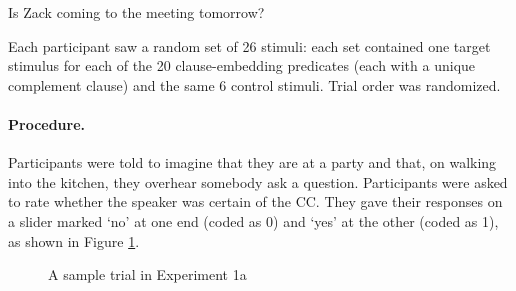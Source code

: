 \documentclass{language}
\newcommand{\6}{\mbox{$[\hspace*{-.6mm}[$}}
\newcommand{\9}{\mbox{$]\hspace*{-.6mm}]$}}
\begin{document}
\begin{exe}
\ex\label{control} Is Zack coming to the meeting tomorrow?
\end{exe}


Each participant saw a random set of 26 stimuli: each set contained one target stimulus for each of the 20 clause-embedding predicates (each with a unique complement clause) and the same 6 control stimuli. Trial order was randomized.

\paragraph{Procedure.} Participants were told to imagine that they are at a party and that, on walking into the kitchen, they overhear somebody ask a question. Participants were asked to rate whether the speaker was certain of the CC. They gave their responses on a slider marked `no' at one end (coded as 0) and `yes' at the other (coded as 1), as shown in Figure \ref{fig-trial-exp1}.


\begin{figure}[h!]
\begin{center}
\end{center}
\caption{A sample trial in Experiment 1a}\label{fig-trial-exp1}
\end{figure}
\end{document}
